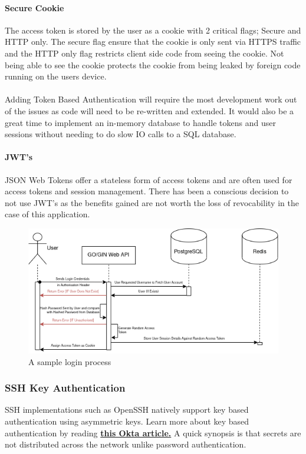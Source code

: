 \paragraph{Secure Cookie}
The access token is stored by the user as a cookie with 2 critical flags; Secure and HTTP only.
The secure flag ensure that the cookie is only sent via HTTPS traffic and the HTTP only flag restricts client side code from seeing the cookie.
Not being able to see the cookie protects the cookie from being leaked by foreign code running on the users device.

\paragraph{}
Adding Token Based Authentication will require the most development work out of the issues as code will need to be re-written and extended.
It would also be a great time to implement an in-memory database to handle tokens and user sessions without needing to do slow IO calls to a 
SQL database.

\paragraph{JWT's}
JSON Web Tokens offer a stateless form of access tokens and are often used for access tokens and session management.
There has been a conscious decision to not use JWT's as the benefits gained are not worth the loss of revocability in the case of this application.

\begin{figure}[h!]
    \includegraphics[width=\textwidth]{res/token_authorisation}
    \caption{A sample login process}
    \label{fig:loggin-in-sample}
\end{figure}

\subsubsection{SSH Key Authentication}
SSH implementations such as OpenSSH natively support key based authentication using asymmetric keys.
Learn more about key based authentication by reading \href{https://www.okta.com/identity-101/asymmetric-encryption/}{\textbf{this Okta article.}}
A quick synopsis is that secrets are not distributed across the network unlike password authentication.

